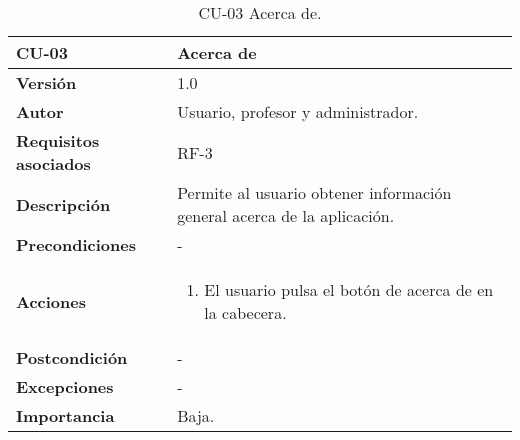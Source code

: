 \begin{table}[p]
	\centering
	\begin{tabularx}{\linewidth}{ p{} p{} }
		\toprule
		\textbf{CU-03}    & \textbf{Acerca de}\\
		\toprule
		\textbf{Versión}              & 1.0    \\
		\textbf{Autor}                & Usuario, profesor y administrador. \\
		\textbf{Requisitos asociados} & RF-3\\
		\textbf{Descripción}          & Permite al usuario obtener información general acerca de la aplicación. \\
		\textbf{Precondiciones}         & - \\
		\textbf{Acciones}             &
		\begin{enumerate}
			\def\labelenumi{\arabic{enumi}.}
			\tightlist
			\item El usuario pulsa el botón de acerca de en la cabecera.
		\end{enumerate}\\
         \textbf{Postcondición}             & - \\
		\textbf{Excepciones}             & - \\
		\textbf{Importancia}          & Baja. \\
		\bottomrule
	\end{tabularx}
	\caption{CU-03 Acerca de.}
\end{table}

